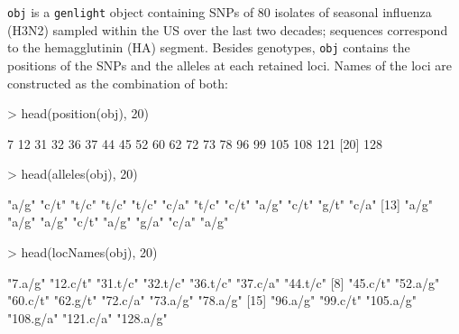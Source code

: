 \documentclass{article}
\begin{document}
\noindent \texttt{obj} is a \texttt{genlight} object containing SNPs of 80 isolates of seasonal
influenza (H3N2) sampled within the US over the last two decades; sequences correspond to the
hemagglutinin (HA) segment.
Besides genotypes, \texttt{obj} contains the positions of the SNPs and the alleles at each retained loci.
Names of the loci are constructed as the combination of both:
\begin{Schunk}
\begin{Sinput}
> head(position(obj), 20)
\end{Sinput}
\begin{Soutput}
 [1]   7  12  31  32  36  37  44  45  52  60  62  72  73  78  96  99 105 108 121
[20] 128
\end{Soutput}
\begin{Sinput}
> head(alleles(obj), 20)
\end{Sinput}
\begin{Soutput}
 [1] "a/g" "c/t" "t/c" "t/c" "t/c" "c/a" "t/c" "c/t" "a/g" "c/t" "g/t" "c/a"
[13] "a/g" "a/g" "a/g" "c/t" "a/g" "g/a" "c/a" "a/g"
\end{Soutput}
\begin{Sinput}
> head(locNames(obj), 20)
\end{Sinput}
\begin{Soutput}
 [1] "7.a/g"   "12.c/t"  "31.t/c"  "32.t/c"  "36.t/c"  "37.c/a"  "44.t/c" 
 [8] "45.c/t"  "52.a/g"  "60.c/t"  "62.g/t"  "72.c/a"  "73.a/g"  "78.a/g" 
[15] "96.a/g"  "99.c/t"  "105.a/g" "108.g/a" "121.c/a" "128.a/g"
\end{Soutput}
\end{Schunk}
\end{document}
